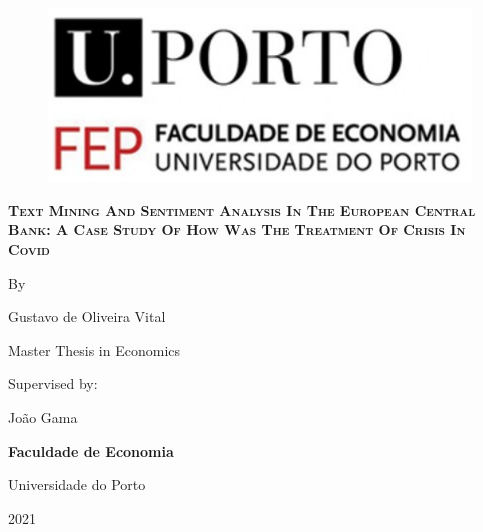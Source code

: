 \date{}
\begin{titlepage}
\begin{center}

\begin{figure}[ht!]
    \centering
    \includegraphics[scale=0.5]{images/FEP.PNG}
\end{figure}

\vspace*{0.7in}
{\LARGE \textbf{ {\scshape Text Mining And Sentiment Analysis In The European Central Bank: A Case Study Of How Was The Treatment Of Crisis In Covid}}}
\par
\vspace{0.4in}
{\large By}
\par
\vspace{0.4in}
{\large Gustavo de Oliveira Vital}
\par
\vspace{1in}
{\large Master Thesis in Economics}
\par
\vspace{0.8in}
\end{center}
{\large Supervised by:} \\ 
\par
{\large João Gama}
\par
\vspace{0.10in}
\vspace{1in}
\begin{center}
{\large \textbf{Faculdade de Economia}}
\par
\vspace{0.10in}
{\large Universidade do Porto}
\par
\vspace{0.2in}
{\large 2021}
\end{center}
\end{titlepage}

